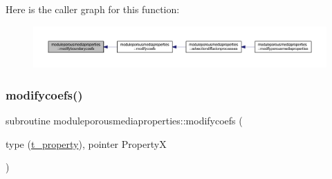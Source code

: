 Here is the caller graph for this function\+:\nopagebreak
\begin{figure}[H]
\begin{center}
\leavevmode
\includegraphics[width=350pt]{namespacemoduleporousmediaproperties_a4a088b65d745be5c1c555008b706cf6a_icgraph}
\end{center}
\end{figure}
\mbox{\label{namespacemoduleporousmediaproperties_adff3b6aa5d450f391ceaa763c275a82a}} 
\subsubsection{\texorpdfstring{modifycoefs()}{modifycoefs()}}
{\footnotesize\ttfamily subroutine moduleporousmediaproperties\+::modifycoefs (\begin{DoxyParamCaption}\item[{type (\mbox{\hyperlink{structmoduleporousmediaproperties_1_1t__property}{t\+\_\+property}}), pointer}]{PropertyX }\end{DoxyParamCaption})\hspace{0.3cm}{\ttfamily [private]}}

